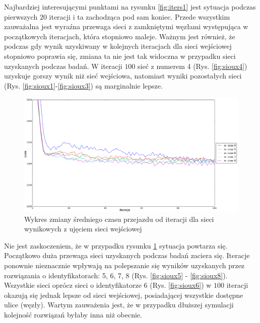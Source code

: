 \documentclass[twoside,12pt]{report}
\begin{document}
Najbardziej interesującymi punktami na rysunku \ref{fig:iters1} jest sytuacja podczas pierwszych $20$ iteracji i ta zachodząca pod sam koniec. Przede wszystkim zauważalna jest wyraźna przewaga sieci z zamkniętymi węzłami występująca w początkowych iteracjach, która stopniowo maleje. Ważnym jest również, że podczas gdy wynik uzyskiwany w kolejnych iteracjach dla sieci wejściowej stopniowo poprawia się, zmiana ta nie jest tak widoczna w przypadku sieci uzyskanych podczas badań. W iteracji $100$ sieć z numerem 4 (Rys. \ref{fig:sioux4}) uzyskuje gorszy wynik niż sieć wejściowa, natomiast wyniki pozostałych sieci (Rys. \ref{fig:sioux1}-\ref{fig:sioux3}) są marginalnie lepsze.

\begin{figure}[htbp]
\centering
\includegraphics[width=1\textwidth]{img/iters/iters2}
\caption{Wykres zmiany średniego czasu przejazdu od iteracji dla sieci wynikowych z ujęciem sieci wejściowej}
\label{fig:iters2}
\end{figure}

Nie jest zaskoczeniem, że w przypadku rysunku \ref{fig:iters2} sytuacja powtarza się. Początkowo duża przewaga sieci uzyskanych podczas badań zaciera się. Iteracje ponownie nieznacznie wpływają na polepszanie się wyników uzyskanych przez rozwiązania o identyfikatorach: 5, 6, 7, 8 (Rys. \ref{fig:sioux5} - \ref{fig:sioux8}). Wszystkie sieci oprócz sieci o identyfikatorze 6 (Rys. \ref{fig:sioux6}) w $100$ iteracji okazują się jednak lepsze od sieci wejściowej, posiadającej wszystkie dostępne ulice (węzły). Wartym zauważenia jest, że w przypadku dłuższej symulacji kolejność rozwiązań byłaby inna niż obecnie.
\end{document}
